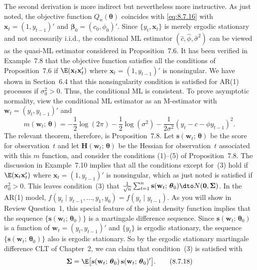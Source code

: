 The second derivation is more indirect but nevertheless more instructive. As
just noted, the objective function $Q_n(\boldsymbol{\theta})$ coincides with \eqref{eq:8.7.16} with
$\mathbf{x}_t = (1, y_{t-1})'$
and $\boldsymbol{\beta}_0 = (c_0, \phi_0)'$. Since $\{y_t, \mathbf{x}_t\}$ is merely ergodic stationary and not necessarily
i.i.d., the conditional ML estimator $(\hat{c}, \hat{\phi}, \hat{\sigma}^2)$ can be viewed as the quasi-ML estimator considered in Proposition~7.6. It has been verified in Example~7.8 that the
objective function satisfies all the conditions of Proposition~7.6 if $\E(\mathbf{x}_t\mathbf{x}_t')$ where
$\mathbf{x}_t = (1, y_{t-1})'$ is nonsingular. We have shown in Section~6.4 that this nonsingularity condition is satisfied for AR(1) processes if $\sigma_0^2 > 0$. Thus, the conditional ML
is consistent. To prove asymptotic normality, view the conditional ML estimator
as an M-estimator with $\mathbf{w}_t = (y_t, y_{t-1})'$ and
\begin{equation}
  m(\mathbf{w}_t;\, \boldsymbol{\theta})
  = -\frac{1}{2}\log(2\pi) - \frac{1}{2}\log(\sigma^2)
    - \frac{1}{2\sigma^2}(y_t - c - \phi y_{t-1})^2.
  \label{eq:8.7.17} \tag{8.7.17}
\end{equation}
The relevant theorem, therefore, is Proposition~7.8. Let $\mathbf{s}(\mathbf{w}_t;\, \boldsymbol{\theta})$ be the score for
observation~$t$ and let $\mathbf{H}(\mathbf{w}_t;\, \boldsymbol{\theta})$ be the Hessian for observation~$t$ associated with this
$m$ function, and consider the conditions (1)--(5) of Proposition~7.8. The discussion
in Example~7.10 implies that all the conditions except for~(3) hold if $\E(\mathbf{x}_t\mathbf{x}_t')$ where
$\mathbf{x}_t = (1, y_{t-1})'$ is nonsingular, which as just noted is satisfied if $\sigma_0^2 > 0$. This leaves
condition~(3) that
$\frac{1}{\sqrt{n}}\sum_{t=1}^{n} \mathbf{s}(\mathbf{w}_t;\, \boldsymbol{\theta}_0) \dto N(\mathbf{0}, \boldsymbol{\Sigma})$.
In the AR(1) model, $f(y_t \mid y_{t-1}, \ldots, y_1, y_0) = f(y_t \mid y_{t-1})$. As you will show in Review Question~1, this
special feature of the joint density function implies that the sequence
$\{\mathbf{s}(\mathbf{w}_t;\, \boldsymbol{\theta}_0)\}$ is
a martingale difference sequence. Since $\mathbf{s}(\mathbf{w}_t;\, \boldsymbol{\theta}_0)$ is a function of
$\mathbf{w}_t = (y_t, y_{t-1})'$
and $\{y_t\}$ is ergodic stationary, the sequence $\{\mathbf{s}(\mathbf{w}_t;\, \boldsymbol{\theta}_0)\}$ also is ergodic stationary.
So by the ergodic stationary martingale difference CLT of Chapter~2, we can claim
that condition~(3) is satisfied with
\begin{equation}
  \boldsymbol{\Sigma}
  = \E\bigl[\mathbf{s}(\mathbf{w}_t;\, \boldsymbol{\theta}_0)\,
    \mathbf{s}(\mathbf{w}_t;\, \boldsymbol{\theta}_0)'\bigr].
  \label{eq:8.7.18} \tag{8.7.18}
\end{equation}


